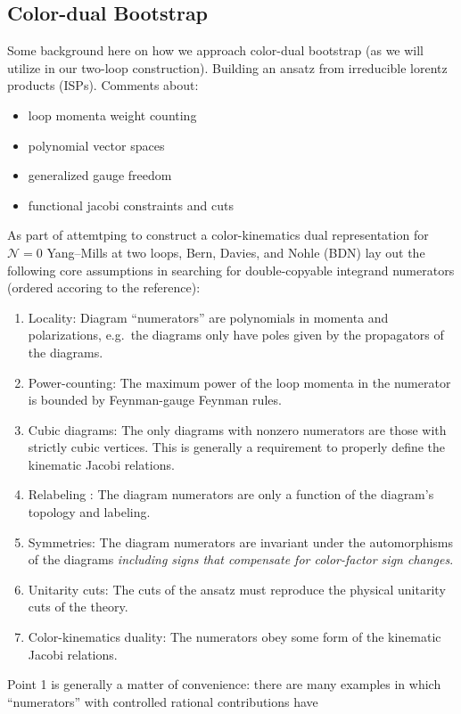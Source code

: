 \documentclass[11pt,letter]{article}
\newcommand{\eg}{e.g.~}
\begin{document}
\subsection{Color-dual Bootstrap}
\label{sec:bootstrap}
Some background here on how we approach color-dual bootstrap (as we will utilize in our two-loop construction). Building an ansatz from irreducible lorentz products (ISPs). Comments about:
\begin{itemize}
\item loop momenta weight counting 
\item polynomial vector spaces 
\item generalized gauge freedom
\item functional jacobi constraints and cuts
\end{itemize}


As part of attemtping to construct a color-kinematics dual
representation for $\mathcal{N}=0$ Yang--Mills at two loops, Bern,
Davies, and Nohle (BDN) \cite{Bern:2015ooa} lay out the following core
assumptions in searching for double-copyable integrand numerators (ordered accoring to the
reference):
\begin{enumerate}
\item Locality: Diagram ``numerators'' are polynomials in momenta and
  polarizations, \eg the diagrams only have poles given by the
  propagators of the diagrams.
\item Power-counting: The maximum power of the loop momenta in the
  numerator is bounded by Feynman-gauge Feynman rules.
\item Cubic diagrams: The only diagrams with nonzero numerators are
  those with strictly cubic vertices.  This is generally a requirement
  to properly define the kinematic Jacobi relations.
\item Relabeling : The diagram numerators are only a function of the
  diagram's topology and labeling.
\item Symmetries: The diagram numerators are invariant under the
  automorphisms of the diagrams \emph{including signs that compensate
    for color-factor sign changes}.
\item Unitarity cuts: The cuts of the ansatz must reproduce the
  physical unitarity cuts of the theory.
\item Color-kinematics duality: The numerators obey some form of the
  kinematic Jacobi relations.
\end{enumerate}
Point 1 is generally a matter of convenience: there are many examples
in which ``numerators'' with controlled rational contributions have
\end{document}

